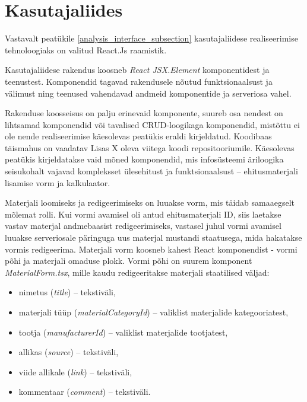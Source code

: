 \section{Kasutajaliides}
Vastavalt peatükile \ref{analysis_interface_subsection} kasutajaliidese realiseerimise tehnoloogiaks
on valitud React.Js raamistik.

Kasutajaliidese rakendus koosneb \textit{React JSX.Element} komponentidest ja teenustest.
Komponendid tagavad rakendusele nõutud funktsionaalsust ja välimust ning teenused vahendavad andmeid komponentide 
ja serveriosa vahel.

Rakenduse koosseisus on palju erinevaid komponente, suureb osa nendest on lihtsamad komponendid või tavalised
CRUD-loogikaga komponendid, mistõttu ei ole nende realiseerimise käesolevas peatükis eraldi kirjeldatud. Koodibaas
täismahus on vaadatav  Lisas X oleva viitega koodi repositooriumile. Käesolevas peatükis kirjeldatakse vaid mõned
komponendid, mis infosüsteemi äriloogika seisukohalt vajavad kompleksset ülesehitust ja funktsionaalsust -- 
ehitusmaterjali lisamise vorm ja kalkulaator.

Materjali loomiseks ja redigeerimiseks on luuakse vorm, mis täidab samaaegselt mõlemat rolli.
Kui vormi avamisel oli antud ehitusmaterjali ID, siis laetakse vastav materjal andmebaasist redigeerimiseks, 
vastasel juhul vormi avamisel luuakse serveriosale päringuga uus materjal mustandi staatusega, mida hakatakse
vormis redigeerima. Materjali vorm koosneb kahest React komponendist - vormi põhi ja materjali omaduse plokk.
Vormi põhi on suurem komponent \textit{MaterialForm.tsx}, mille kaudu redigeeritakse materjali staatilised 
väljad:

\begin{itemize}
    \item nimetus (\textit{title}) -- tekstiväli,
    \item materjali tüüp (\textit{materialCategoryId}) -- valiklist materjalide kategooriatest, 
    \item tootja (\textit{manufacturerId}) -- valiklist materjalide tootjatest,
    \item allikas (\textit{source}) -- tekstiväli,
    \item viide allikale (\textit{link}) -- tekstiväli,
    \item kommentaar (\textit{comment}) -- tekstiväli.
\end{itemize}


